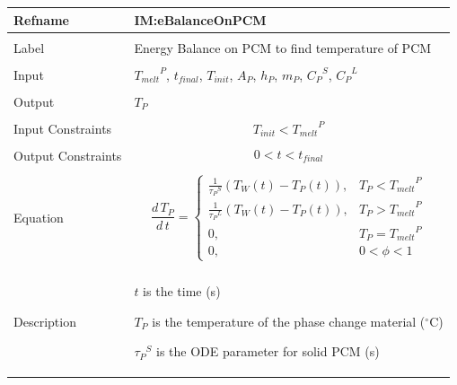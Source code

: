 \documentclass[12pt]{article}
\begin{document}
\noindent \begin{minipage}{\textwidth}
\begin{tabular}{p{} p{}}
\toprule \textbf{Refname} & \textbf{IM:eBalanceOnPCM}
\label{IM:eBalanceOnPCM}
\\ \midrule \\
Label & Energy Balance on PCM to find temperature of PCM
\\ \midrule \\
Input & ${{T_{melt}}^{P}}$, ${t_{final}}$, ${T_{init}}$, ${A_{P}}$, ${h_{P}}$, ${m_{P}}$, ${{C_{P}}^{S}}$, ${{C_{P}}^{L}}$
\\ \midrule \\
Output & ${T_{P}}$
\\ \midrule \\
Input Constraints & \begin{displaymath}
                    {T_{init}}<{{T_{melt}}^{P}}
                    \end{displaymath}
\\ \midrule \\
Output Constraints & \begin{displaymath}
                     0<t<{t_{final}}
                     \end{displaymath}
\\ \midrule \\
Equation & \begin{displaymath}
           \frac{d\,{T_{P}}}{d\,t}=\begin{cases}
\frac{1}{{{τ_{P}}^{S}}} \left({T_{W}}\left(t\right)-{T_{P}}\left(t\right)\right), & {T_{P}}<{{T_{melt}}^{P}}\\
\frac{1}{{{τ_{P}}^{L}}} \left({T_{W}}\left(t\right)-{T_{P}}\left(t\right)\right), & {T_{P}}>{{T_{melt}}^{P}}\\
0, & {T_{P}}={{T_{melt}}^{P}}\\
0, & 0<ϕ<1
\end{cases}
           \end{displaymath}
\\ \midrule \\
Description & \begin{symbDescription}
              \item{$t$ is the time (s)}
              \item{${T_{P}}$ is the temperature of the phase change material (${}^{\circ}$C)}
              \item{${{τ_{P}}^{S}}$ is the ODE parameter for solid PCM (s)}

\end{symbDescription}
\end{tabular}
\end{minipage}
\end{document}
